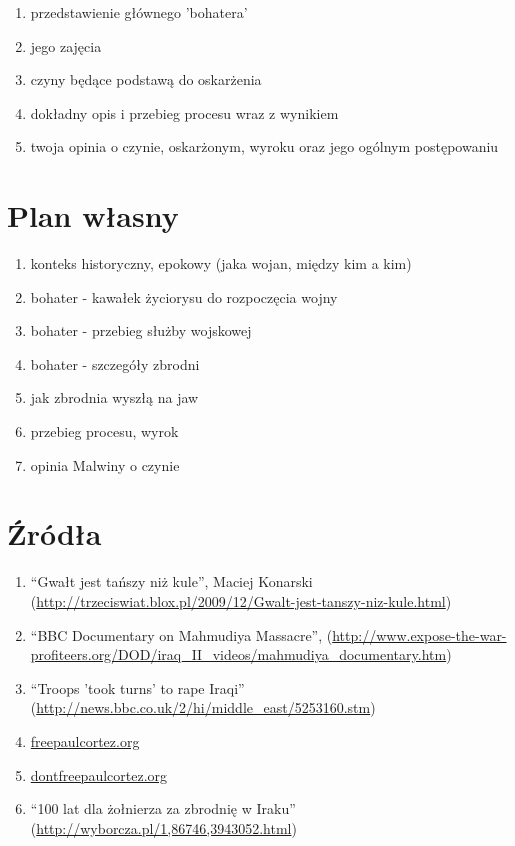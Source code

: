 \documentclass[12pt,a4paper]{article}
\begin{document}
\begin{enumerate}
\item przedstawienie głównego 'bohatera'
\item jego zajęcia
\item czyny będące podstawą do oskarżenia
\item dokładny opis i przebieg procesu wraz z wynikiem
\item twoja opinia o czynie, oskarżonym, wyroku oraz jego ogólnym postępowaniu
\end{enumerate}

\section{Plan własny}

\begin{enumerate}
\item konteks historyczny, epokowy (jaka wojan, między kim a kim)
\item bohater - kawałek życiorysu do rozpoczęcia wojny
\item bohater - przebieg służby wojskowej
\item bohater - szczegóły zbrodni
\item jak zbrodnia wyszłą na jaw
\item przebieg procesu, wyrok
\item opinia Malwiny o czynie
\end{enumerate}

\section{Źródła}

\begin{enumerate}
\item ``Gwałt jest tańszy niż kule'', Maciej Konarski (\url{http://trzeciswiat.blox.pl/2009/12/Gwalt-jest-tanszy-niz-kule.html})
\item ``BBC Documentary on Mahmudiya Massacre'',
  (\url{http://www.expose-the-war-profiteers.org/DOD/iraq_II_videos/mahmudiya_documentary.htm})
\item ``Troops 'took turns' to rape Iraqi'' (\url{http://news.bbc.co.uk/2/hi/middle_east/5253160.stm})
\item \url{freepaulcortez.org}
\item \url{dontfreepaulcortez.org}
\item ``100 lat dla żołnierza za zbrodnię w Iraku'' (\url{http://wyborcza.pl/1,86746,3943052.html})
\end{enumerate}
\end{document}

